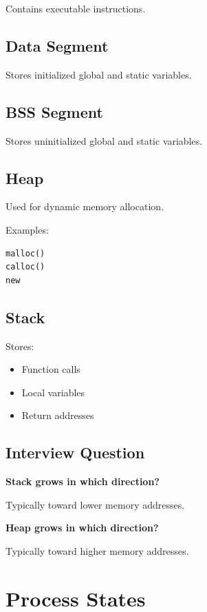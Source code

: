 Contains executable instructions.

\subsection{Data Segment}

Stores initialized global and static variables.

\subsection{BSS Segment}

Stores uninitialized global and static variables.

\subsection{Heap}

Used for dynamic memory allocation.

Examples:

\begin{verbatim}
malloc()
calloc()
new
\end{verbatim}

\subsection{Stack}

Stores:

\begin{itemize}
\item Function calls
\item Local variables
\item Return addresses
\end{itemize}

\subsection{Interview Question}

\textbf{Stack grows in which direction?}

Typically toward lower memory addresses.

\textbf{Heap grows in which direction?}

Typically toward higher memory addresses.

\section{Process States}

